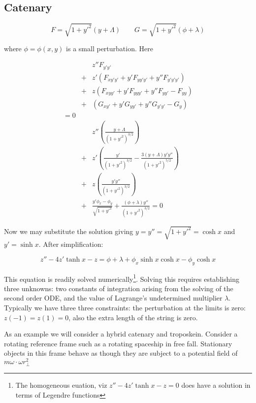 \documentclass[pdflatex,sn-mathphys-num]{sn-jnl}%
\theoremstyle{thmstyleone}%
\theoremstyle{thmstyletwo}%
\theoremstyle{thmstylethree}%
\begin{document}
\subsection{Catenary}

\begin{equation}\label{FandG}
F = \sqrt{1+y'^2}(y + \Lambda)\qquad G =  \sqrt{1+y'^2}(\phi + \lambda)
\end{equation}

where $\phi=\phi(x,y)$ is a small perturbation.  Here 

\begin{eqnarray}
&{}& z''F_{y'y'}\nonumber\\
&+& z'(F_{xy'y'} + y'F_{yy'y'} + y''F_{y'y'y'})\nonumber\\
&+& z (F_{xyy'} + y'F_{yyy'} + y''F_{yy'}-F_{yy})\nonumber\\
&+& (G_{xy'} + y'G_{yy'} + y''G_{y'y'}- G_{y})\nonumber\\
= 0\\
&{}&  z''\left(\frac{y+\Lambda}{(1+y'^2)^{3/2}}\right)\nonumber\\
&+& z' \left(\frac{y'}{(1+y'^2)^{3/2}} -\frac{3(y+\Lambda)y'y''}{(1+y'^2)^{5/2}}\right)\nonumber\\
&+& z  \left(\frac{y'y''}{(1+y'^2)^{3/2}}\right)\nonumber\\
&+& \frac{y'\phi_x-\phi_y}{\sqrt{1+y'^2}} + \frac{(\phi+\lambda)y''}{(1+y'^2)^{3/2}}=0
\end{eqnarray}

Now we may substitute the solution giving $y=y''=\sqrt{1+y'^2}=\cosh
x$ and $y'=\sinh x$.  After simplification:

\begin{equation}\label{pertcan}
  z'' - 4z'\tanh x - z =
  \phi + \lambda + \phi_x\sinh x\cosh x - \phi_y\cosh x
\end{equation}

This equation is readily solved numerically\footnote{The homogeneous
euation, viz $z'' - 4z'\tanh x - z = 0$ does have a solution in terms
of Legendre functions}.  Solving this requires establishing three
unknowns: two constants of integration arising from the solving of the
second order ODE, and the value of Lagrange's undetermined multiplier
$\lambda$.  Typically we have three three constraints: the
perturbation at the limits is zero: $z(-1)=z(1)=0$, also the extra
length of the string is zero.

As an example we will consider a hybrid catenary and troposkein.
Consider a rotating reference frame such as a rotating spaceship in
free fall.  Stationary objects in this frame behave as though they are
subject to a potential field of $m\omega\cdot\omega r_\perp^2$
\end{document}
